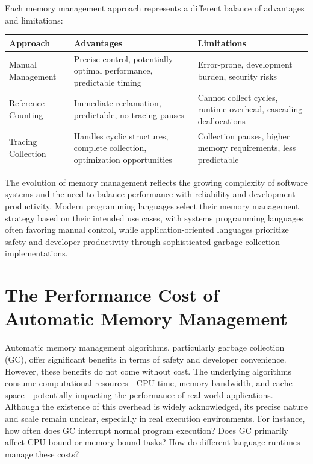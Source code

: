 \documentclass{article}
\begin{document}
Each memory management approach represents a different balance of advantages and limitations:

\begin{center}
\begin{tabular}{|p{3cm}|p{5cm}|p{5cm}|}
\hline
\textbf{Approach} & \textbf{Advantages} & \textbf{Limitations} \\
\hline
Manual Management & Precise control, potentially optimal performance, predictable timing & Error-prone, development burden, security risks \\
\hline
Reference Counting & Immediate reclamation, predictable, no tracing pauses & Cannot collect cycles, runtime overhead, cascading deallocations \\
\hline
Tracing Collection & Handles cyclic structures, complete collection, optimization opportunities & Collection pauses, higher memory requirements, less predictable \\
\hline
\end{tabular}
\end{center}

The evolution of memory management reflects the growing complexity of software systems and the need to balance performance with reliability and development productivity. Modern programming languages select their memory management strategy based on their intended use cases, with systems programming languages often favoring manual control, while application-oriented languages prioritize safety and developer productivity through sophisticated garbage collection implementations.

\section{The Performance Cost of Automatic Memory Management}

Automatic memory management algorithms, particularly garbage collection (GC), offer significant benefits in terms of safety and developer convenience. However, these benefits do not come without cost. The underlying algorithms consume computational resources—CPU time, memory bandwidth, and cache space—potentially impacting the performance of real-world applications. Although the existence of this overhead is widely acknowledged, its precise nature and scale remain unclear, especially in real execution environments. For instance, how often does GC interrupt normal program execution? Does GC primarily affect CPU-bound or memory-bound tasks? How do different language runtimes manage these costs? 
\end{document}
